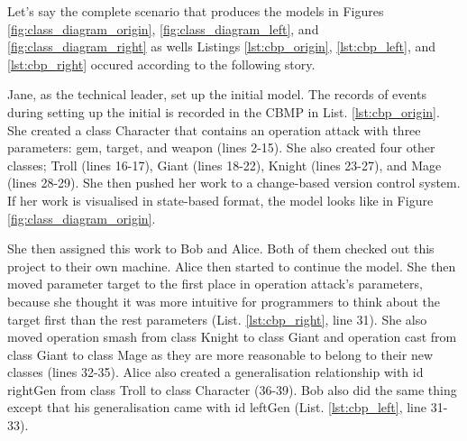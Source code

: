 Let's say the complete scenario that produces the models in Figures \ref{fig:class_diagram_origin}, \ref{fig:class_diagram_left}, and \ref{fig:class_diagram_right} as wells Listings \ref{lst:cbp_origin}, \ref{lst:cbp_left}, and \ref{lst:cbp_right} occured according to the following story.

Jane, as the technical leader, set up the initial model. The records of events during setting up the initial is recorded in the CBMP in List. \ref{lst:cbp_origin}. She created a class \textsf{Character} that contains an operation \textsf{attack} with three parameters: \textsf{gem}, \textsf{target}, and \textsf{weapon} (lines 2-15). She also created four other classes; \textsf{Troll} (lines 16-17), \textsf{Giant} (lines 18-22), \textsf{Knight} (lines 23-27), and \textsf{Mage} (lines 28-29). She then pushed her work to a change-based version control system. If her work is visualised in state-based format, the model looks like in Figure \ref{fig:class_diagram_origin}.

She then assigned this work to Bob and Alice. Both of them checked out this project to their own machine. Alice then started to continue the model. She then moved parameter \textsf{target} to the first place in operation \textsf{attack}'s parameters, because she thought it was more intuitive for programmers to think about the \textsf{target} first than the rest parameters (List. \ref{lst:cbp_right}, line 31). She also moved operation \textsf{smash} from class \textsf{Knight} to class \textsf{Giant} and operation \textsf{cast} from class \textsf{Giant} to class \textsf{Mage} as they are more reasonable to belong to their new classes (lines 32-35). Alice also created a generalisation relationship with id \textsf{rightGen} from class \textsf{Troll} to class \textsf{Character} (36-39). Bob also did the same thing except that his generalisation came with id \textsf{leftGen} (List. \ref{lst:cbp_left}, line 31-33). 

